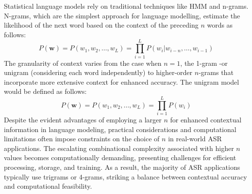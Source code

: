 Statistical language models rely on traditional techniques like HMM and n-grams. N-grams, which are the simplest approach for language modelling, estimate the likelihood of the next word based on the context of the preceding $n$ words as follows:
\begin{equation}
    P(\boldsymbol{w})= P(w_1 , w_2 ,\dots,w_L)  =\prod_{i=1}^L P(w_i| w_{i-n} , \dots,w_{i-1}  )
\end{equation}
The granularity of context varies from the case when $n=1$, the 1-gram -or unigram (considering each word independently) to higher-order $n$-grams that incorporate more extensive context for enhanced accuracy. The unigram model would be defined as follows:
\begin{equation}
    P(\boldsymbol{w})=P(w_1, w_2,\dots,w_L )  = \prod_{i=1}^L P(w_i)
\end{equation}
Despite the evident advantages of employing a larger $n$ for enhanced contextual information in language modeling, practical considerations and computational limitations often impose constraints on the choice of $n$ in real-world ASR applications. The escalating combinational complexity associated with higher $n$ values becomes computationally demanding, presenting challenges for efficient processing, storage, and training. As a result, the majority of ASR applications typically use trigrams or 4-grams, striking a balance between contextual accuracy and computational feasibility.

